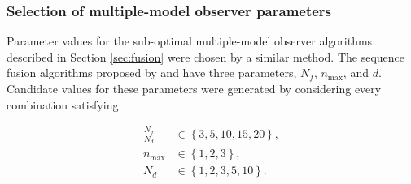 \subsubsection{Selection of multiple-model observer parameters} \label{sec:sim-obs-lin-1-MKF-tuning}

Parameter values for the sub-optimal multiple-model observer algorithms described in Section \ref{sec:fusion} were chosen by a similar method. The sequence fusion algorithms proposed by \cite{robertson_detection_1995} and \cite{robertson_method_1998} have three parameters, $N_f$, $n_\text{max}$, and $d$. Candidate values for these parameters were generated by considering every combination satisfying

\begin{equation} \label{eq:sim-sys-siso-MKF-SF-param-values}
	\begin{aligned}
		\frac{N_f}{N_d} &\in \left\{3, 5, 10, 15, 20\right\},  \\
		n_\text{max} &\in \left\{1, 2, 3\right\},  \\
		N_d &\in \left\{1, 2, 3, 5, 10\right\}.
	\end{aligned}
\end{equation}

